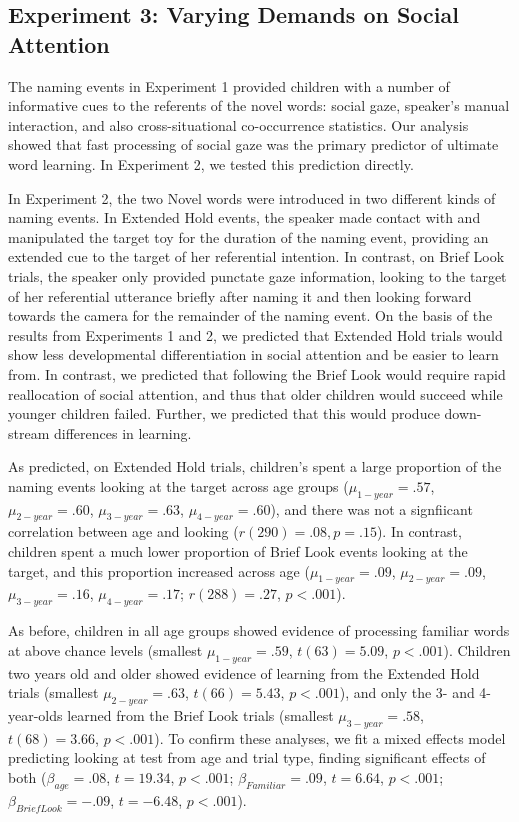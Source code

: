 \documentclass{pnastwo}
\begin{document}
\begin{article}
\section{Experiment 3: Varying Demands on Social Attention}

The naming events in Experiment 1 provided children with a number of informative cues to the referents of the novel words: social gaze, speaker's manual interaction, and also cross-situational co-occurrence statistics. Our analysis showed that fast processing of social gaze was the primary predictor of ultimate word learning. In Experiment 2, we tested this prediction directly. 

In Experiment 2, the two Novel words were introduced in two different kinds of naming events. In Extended Hold events, the speaker made contact with and manipulated the target toy for the duration of the naming event, providing an extended cue to the target of her referential intention. In contrast, on Brief Look trials, the speaker only provided punctate gaze information, looking to the target of her referential utterance briefly after naming it and then looking forward towards the camera for the remainder of the naming event. On the basis of the results from Experiments 1 and 2, we predicted that Extended Hold trials would show less developmental differentiation in social attention and be easier to learn from. In contrast, we predicted that following the Brief Look would require rapid reallocation of social attention, and thus that older children would succeed while younger children failed. Further, we predicted that this would produce down-stream differences in learning.

As predicted, on Extended Hold trials, children's spent a large proportion of the naming events looking at the target across age groups ($\mu_{1-year} = .57$, $\mu_{2-year} = .60$, $\mu_{3-year} = .63$, $\mu_{4-year} = .60$), and there was not a signfiicant correlation between age and looking ($r(290) = .08, p = .15$). In contrast, children spent a much lower proportion of Brief Look events looking at the target, and this proportion increased across age ($\mu_{1-year} = .09$, $\mu_{2-year} = .09$, $\mu_{3-year} = .16$, $\mu_{4-year} = .17$; $r(288) = .27$, $p  < .001$). 

As before, children in all age groups showed evidence of processing familiar words at above chance levels (smallest $\mu_{1-year} = .59$, $t(63) = 5.09$, $p < .001$). Children two years old and older showed evidence of learning from the Extended Hold trials (smallest $\mu_{2-year} = .63$, $t(66) = 5.43$, $p < .001$), and only the 3- and 4-year-olds learned from the Brief Look trials (smallest $\mu_{3-year} = .58$, $t(68) = 3.66$, $p < .001$). To confirm these analyses, we fit a mixed effects model predicting looking at test from age and trial type, finding significant effects of both ($\beta_{age} = .08$, $t = 19.34$, $p < . 001$; $\beta_{Familiar} = .09$, $t = 6.64$, $p < . 001$; $\beta_{Brief Look} = -.09$, $t = -6.48$, $p < . 001$).


\end{article}
\end{document}
